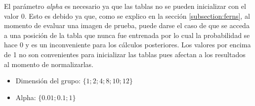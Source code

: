 	El parámetro \textit{alpha} es necesario ya que las tablas no se pueden inicializar con el valor $0$. Esto es debido ya que, como se explico en la sección \ref{subsection:ferns}, al momento de evaluar una imagen de prueba, puede darse el caso de que se acceda a una posición de la tabla que nunca fue entrenada por lo cual la probabilidad se hace 0 y es un inconveniente para los cálculos posteriores. Los valores por encima de 1 no son convenientes para inicializar las tablas pues afectan a los resultados al momento de normalizarlas.

	\begin{itemize}
		\item Dimensión del grupo: $\{ 1; 2; 4; 8; 10; 12 \}$
		\item Alpha: $\{ 0.01; 0.1; 1 \}$
	\end{itemize}
